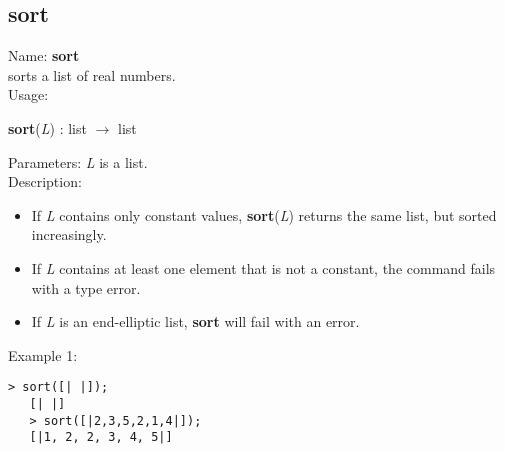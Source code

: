 \subsection{ sort }
\noindent Name: \textbf{sort}\\
sorts a list of real numbers.\\

\noindent Usage: 
\begin{center}
\textbf{sort}(\emph{L}) : \textsf{list} $\rightarrow$ \textsf{list}\\
\end{center}
Parameters: 
\emph{L} is a list.\\

\noindent Description: \begin{itemize}

\item If \emph{L} contains only constant values, \textbf{sort}(\emph{L}) returns the same list, but
   sorted increasingly.

\item If \emph{L} contains at least one element that is not a constant, the command fails 
   with a type error.

\item If \emph{L} is an end-elliptic list, \textbf{sort} will fail with an error.
\end{itemize}
\noindent Example 1: 
\begin{center}\begin{minipage}{14.8cm}\begin{Verbatim}[frame=single]
   > sort([| |]);
   [| |]
   > sort([|2,3,5,2,1,4|]);
   [|1, 2, 2, 3, 4, 5|]
\end{Verbatim}
\end{minipage}\end{center}
